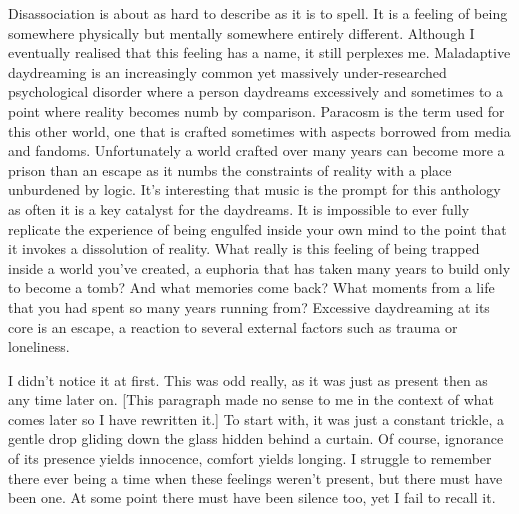 




\prelude

Disassociation is about as hard to describe as it is to spell. It is a
feeling of being somewhere physically but mentally somewhere entirely
different. Although I eventually realised that this feeling has a
name, it still perplexes me. Maladaptive daydreaming is an
increasingly common yet massively under-researched psychological
disorder where a person daydreams excessively and sometimes to a point
where reality becomes numb by comparison. Paracosm is the term used
for this other world, one that is crafted sometimes with aspects
borrowed from media and fandoms. Unfortunately a world crafted over
many years can become more a prison than an escape as it numbs the
constraints of reality with a place unburdened by logic.  It's
interesting that music is the prompt for this anthology as often it is
a key catalyst for the daydreams. It is impossible to ever fully
replicate the experience of being engulfed inside your own mind to the
point that it invokes a dissolution of reality.
What really is this feeling of being trapped inside a
world you've created, a euphoria that has taken many years to build
only to become a tomb? And what memories come back? What moments from
a life that you had spent so many years running from? Excessive
daydreaming at its core is an escape, a reaction to several external
factors such as trauma or loneliness.

\fugue 

I didn't notice it at first. This was odd really, as it was just as
present then as any time later on. [This paragraph made no sense to me in the context of what comes later so I have rewritten it.]
To start with, it was just a constant trickle, a gentle drop gliding down the
glass hidden behind a curtain. Of course,
ignorance of its presence yields 
innocence, comfort yields longing. I struggle
to remember there ever being a time when these feelings weren't present, but there
must have been one. At some point there must have been silence too, yet I
fail to recall it.

